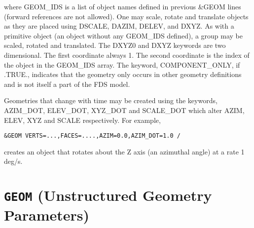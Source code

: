\documentclass[12pt]{article}
\begin{document}
\noindent where GEOM\_IDS is a list of object names defined in previous \&GEOM lines (forward references are not allowed).   One may scale, rotate and translate objects as they are placed using DSCALE, DAZIM, DELEV, and DXYZ.  As with a primitive object (an object without any GEOM\_IDS defined), a group may be scaled, rotated and translated. The DXYZ0 and DXYZ keywords are two dimensional.  The first coordinate always 1.  The second coordinate is the index of the object in the GEOM\_IDS array. The keyword, COMPONENT\_ONLY, if .TRUE., indicates that the geometry only occurs in other geometry definitions and is not itself a part of the FDS model.

Geometries that change with time may be created using the keywords, AZIM\_DOT, ELEV\_DOT, XYZ\_DOT and SCALE\_DOT which alter AZIM, ELEV, XYZ and SCALE respectively. For example,
\begin{verbatim}
&GEOM VERTS=...,FACES=....,AZIM=0.0,AZIM_DOT=1.0 /
\end{verbatim}
creates an object that rotates about the Z axis (an azimuthal angle) at a rate 1 deg/s.

\vspace{\baselineskip}


\section{\texorpdfstring{{\tt GEOM}}{GEOM} (Unstructured Geometry Parameters)}
\end{document}
